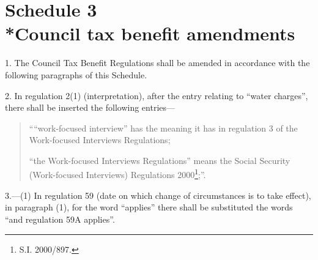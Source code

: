 \documentclass[12pt,a4paper]{article}
\begin{document}
\part[Schedule 3 --- Council tax benefit amendments]{Schedule 3\\*Council tax benefit amendments}

\renewcommand\parthead{--- Schedule 3}

1.  The Council Tax Benefit Regulations shall be amended in accordance with the following paragraphs of this Schedule.

\medskip

2.  In regulation 2(1) (interpretation), after the entry relating to “water charges”, there shall be inserted the following entries—
\begin{quotation}
    ““work-focused interview” has the meaning it has in regulation 3 of the Work-focused Interviews Regulations;

    “the Work-focused Interviews Regulations” means the Social Security (Work-focused Interviews) Regulations 2000\footnote{\frenchspacing S.I. 2000/897.};”. 
\end{quotation}

\medskip

3.---(1)  In regulation 59 (date on which change of circumstances is to take effect), in paragraph (1), for the word “applies” there shall be substituted the words “and regulation 59A applies”.
\end{document}
